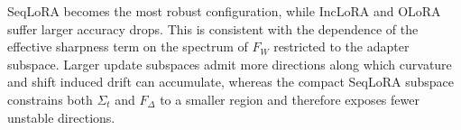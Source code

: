 \documentclass{article}
\theoremstyle{plain}
\theoremstyle{definition}
\theoremstyle{remark}
\begin{document}


SeqLoRA becomes the most robust configuration, while IncLoRA and OLoRA suffer larger accuracy drops. This is consistent with the dependence of the effective sharpness term on the spectrum of $F_W$ restricted to the adapter subspace. Larger update subspaces admit more directions along which curvature and shift induced drift can accumulate, whereas the compact SeqLoRA subspace constrains both $\Sigma_t$ and $F_\Delta$ to a smaller region and therefore exposes fewer unstable directions.


    
\end{document}
